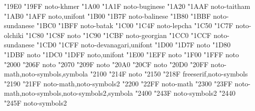 \documentclass{article}
\begin{document}
                                  {  "19E0} {  "19FF} {noto-khmer}
                                       {  "1A00} {  "1A1F} {noto-buginese}
                                       {  "1A20} {  "1AAF} {noto-taitham}
           {  "1AB0} {  "1AFF} {noto,unifont}
                                       {  "1B00} {  "1B7F} {noto-balinese}
                                      {  "1B80} {  "1BBF} {noto-sundanese}
                                          {  "1BC0} {  "1BFF} {noto-batak}
                                         {  "1C00} {  "1C4F} {noto-lepcha}
                                       {  "1C50} {  "1C7F} {noto-olchiki}
                            {  "1C80} {  "1C8F} {noto}
                              {  "1C90} {  "1CBF} {noto-georgian}
                           {  "1CC0} {  "1CCF} {noto-sundanese}
                               {  "1CD0} {  "1CFF} {noto-devanagari,unifont}
                            {  "1D00} {  "1D7F} {noto}
                 {  "1D80} {  "1DBF} {noto}
         {  "1DC0} {  "1DFF} {noto,unifont}
                      {  "1E00} {  "1EFF} {noto}
                                 {  "1F00} {  "1FFF} {noto}
                            {  "2000} {  "206F} {noto}
                    {  "2070} {  "209F} {noto}
                               {  "20A0} {  "20CF} {noto}
        {  "20D0} {  "20FF} {noto-math,noto-symbols,symbola}
                             {  "2100} {  "214F} {noto}
                                   {  "2150} {  "218F} {freeserif,noto-symbols}
                                         {  "2190} {  "21FF} {noto-math,noto-symbols2}
                         {  "2200} {  "22FF} {noto-math}
                        {  "2300} {  "23FF} {noto-math,noto-symbols,noto-symbols2,symbola}
                               {  "2400} {  "243F} {noto-symbols2}
                  {  "2440} {  "245F} {noto-symbols2}
\end{document}
